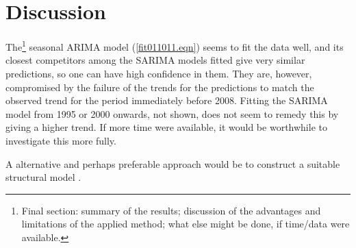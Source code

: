 \documentclass[a4paper,11pt]{article}\usepackage[]{graphicx}\usepackage[]{color}
\def\CO{{CO$_{2}$}}
\begin{document}
%

\section{Discussion}

The\footnote{Final section: summary of the results; discussion of the advantages and  
limitations of the applied method; what else might be done, if time/data were available.} 
seasonal ARIMA model (\ref{fit011011.eqn}) seems to fit the data well, and its closest competitors among the SARIMA models fitted give very similar predictions, so one can have high confidence in them.  They are, however, compromised by the failure of the trends for the predictions to match the observed trend for the period immediately before 2008.  Fitting the SARIMA model from 1995 or 2000 onwards, not shown, does not seem to remedy this by giving a higher trend.  If more time were available, it would be worthwhile to investigate this more fully.  

A alternative and perhaps preferable approach would be to construct a suitable structural model \citep{Durbin.Koopman:2001}.



	
\end{document}
